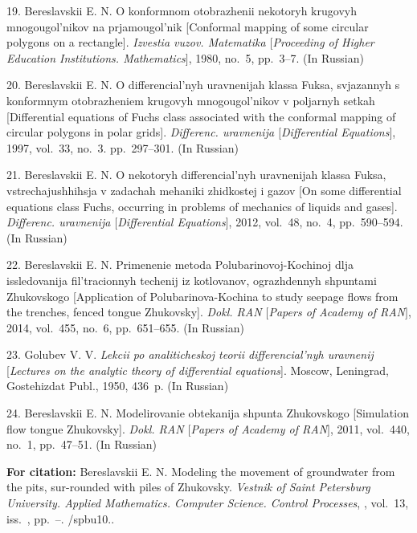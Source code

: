 {19. Bereslavskii E. N. O konformnom otobrazhenii nekotoryh
krugovyh mnogougol'nikov na prjamougol'nik [Conformal mapping of
some circular polygons on a rectangle]. \textit{Izvestia vuzov.
Matematika $[$Proceeding of Higher Education Institutions.
Mathematics$]$}, 1980, no.~5, pp.~3--7. (In Russian)

20. Bereslavskii E. N. O differencial'nyh uravnenijah klassa
Fuksa, svjazannyh s konformnym otobrazheniem krugovyh
mnogougol'nikov v poljarnyh setkah [Differential equations of
Fuchs class associated with the conformal mapping of circular
polygons in polar grids]. \textit{Differenc. uravnenija
$[$Differential Equations$]$}, 1997, vol.~33, no.~3. pp.~297--301.
(In Russian)

21. Bereslavskii E. N. O nekotoryh differencial'nyh uravnenijah
klassa Fuksa, vstrechajushhihsja v zadachah mehaniki zhidkostej i
gazov [On some differential equations class Fuchs, occurring in
problems of mechanics of liquids and gases]. \textit{Differenc.
uravnenija $[$Differential Equations$]$}, 2012, vol.~48, no.~4,
pp.~590--594. (In Russian)

22. Bereslavskii E. N. Primenenie metoda Polubarinovoj-Kochinoj
dlja issledovanija fil'tracionnyh techenij iz kotlovanov,
ograzhdennyh shpuntami Zhukovskogo [Application of
Polubarinova-Kochina to study seepage flows from the trenches,
fenced tongue Zhukovsky]. \textit{Dokl. RAN $[$Papers of Academy
of RAN$]$}, 2014, vol.~455, no.~6, pp.~651--655. (In Russian)

23. Golubev V. V. \textit{Lekcii po analiticheskoj teorii
differencial'nyh uravnenij} [\textit{Lectures on the analytic
theory of differential equations}]. Moscow, Leningrad, Gostehizdat
Publ., 1950, 436~p. (In Russian)

24. Bereslavskii E. N. Modelirovanie obtekanija shpunta
Zhukovskogo [Simulation flow tongue Zhukovsky]. \textit{Dokl. RAN
$[$Papers of Academy of RAN$]$}, 2011, vol.~440, no.~1,
pp.~47--51. (In Russian)

\vskip 2mm

{\bf For citation:}  Bereslavskii E. N.  Modeling the movement of
groundwater from the pits, sur-\linebreak rounded with piles of
Zhukovsky. {\it Vestnik of Saint Petersburg University. Applied
Mathematics. Computer Science. Control Processes}, \issueyear,
vol.~13, iss.~\issuenum, pp.~\pageref{p1}--\pageref{p1e}.
\doivyp/spbu10.\issueyear.


}
